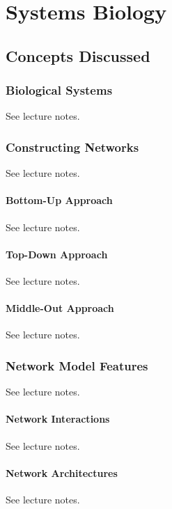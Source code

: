 
\chapter{Systems Biology} 

\label{Chapter10} 

\section{Concepts Discussed}

    \subsection{Biological Systems}
    See lecture notes.\autocite{T10}

    \subsection{Constructing Networks}
    See lecture notes.\autocite{T10}

        \subsubsection{Bottom-Up Approach}
        See lecture notes.\autocite{T10}

        \subsubsection{Top-Down Approach}
        See lecture notes.\autocite{T10}

        \subsubsection{Middle-Out Approach}
        See lecture notes.\autocite{T10}

    \subsection{Network Model Features}
    See lecture notes.\autocite{T10}

        \subsubsection{Network Interactions}
        See lecture notes.\autocite{T10}

        \subsubsection{Network Architectures}
        See lecture notes.\autocite{T10}

